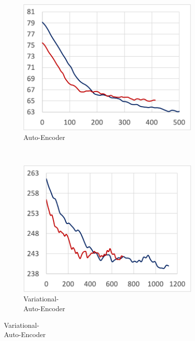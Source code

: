 \begin{figure}[!ht]
\begin{subfigure}[t]{.22\textwidth}
    \includegraphics[width=\textwidth]{tf2-11}
    \caption{\footnotesize Auto-Encoder}
  \end{subfigure}
  ~
  \begin{subfigure}[t]{.22\textwidth}
    \includegraphics[width=\textwidth]{tf2-12}
    \caption{\footnotesize Variational-\\Auto-Encoder}
  \end{subfigure}
  
  \par\bigskip


\end{figure}
